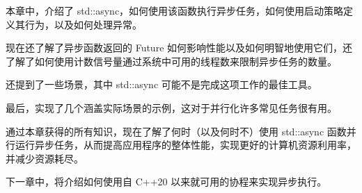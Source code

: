 本章中，介绍了 std::async，如何使用该函数执行异步任务，如何使用启动策略定义其行为，以及如何处理异常。

现在还了解了异步函数返回的 Future 如何影响性能以及如何明智地使用它们，还了解了如何使用计数信号量通过系统中可用的线程数来限制异步任务的数量。

还提到了一些场景，其中 std::async 可能不是完成这项工作的最佳工具。

最后，实现了几个涵盖实际场景的示例，这对于并行化许多常见任务很有用。

通过本章获得的所有知识，现在了解了何时（以及何时不）使用 std::async 函数并行运行异步任务，从而提高应用程序的整体性能，实现更好的计算机资源利用率，并减少资源耗尽。

下一章中，将介绍如何使用自 C++20 以来就可用的协程来实现异步执行。